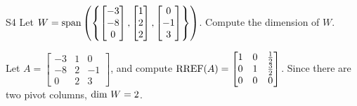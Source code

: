 \documentclass{sbgLAexam}
\begin{document}
\begin{problem}{S4}
Let $W = {\rm span} \left( \left\{  \begin{bmatrix} -3 \\ -8 \\ 0 \end{bmatrix}, \begin{bmatrix} 1 \\ 2 \\ 2 \end{bmatrix}, \begin{bmatrix} 0 \\ -1 \\ 3 \end{bmatrix} \right\} \right)$.  Compute the dimension of $W$.
\end{problem}
\begin{solution}
Let $A= \begin{bmatrix}-3 & 1 & 0 \\ -8 & 2 & -1 \\ 0 & 2 & 3\end{bmatrix}$, and compute $\operatorname{RREF}(A) = \begin{bmatrix} 1 & 0 & \frac{1}{2} \\ 0 & 1 & \frac{3}{2} \\ 0 & 0 & 0 \end{bmatrix}$.
Since there are two pivot columns, ${\rm dim}\ W = 2$.  
\end{solution}
\end{document}
